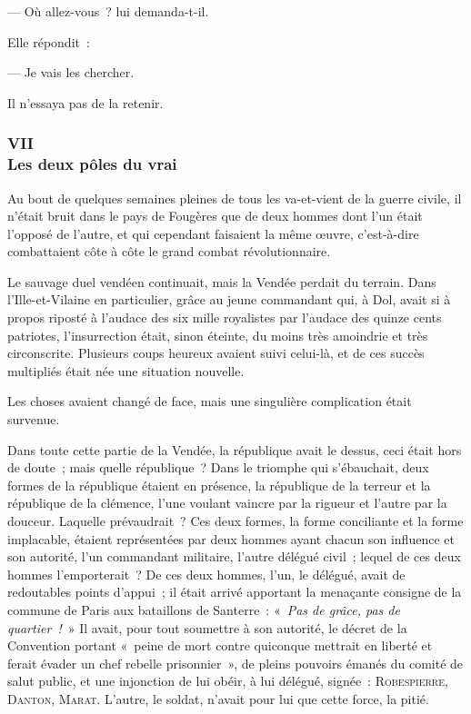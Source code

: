 \documentclass[french,twoside]{book} %
\begin{document}
— Où allez-vous ? lui demanda-t-il.\par
Elle répondit :\par
— Je vais les chercher.\par
Il n’essaya pas de la retenir.
 \subsubsection[{VII. Les deux pôles du vrai}]{VII \\
Les deux pôles du vrai}
\label{p3l2c7}
\noindent Au bout de quelques semaines pleines de tous les va-et-vient de la guerre civile, il n’était bruit dans le pays de Fougères que de deux hommes dont l’un était l’opposé de l’autre, et qui cependant faisaient la même œuvre, c’est-à-dire combattaient côte à côte le grand combat révolutionnaire.\par
Le sauvage duel vendéen continuait, mais la Vendée perdait du terrain. Dans l’Ille-et-Vilaine en particulier, grâce au jeune commandant qui, à Dol, avait si à propos riposté à l’audace des six mille royalistes par l’audace des quinze cents patriotes, l’insurrection était, sinon éteinte, du moins très amoindrie et très circonscrite. Plusieurs coups heureux avaient suivi celui-là, et de ces succès multipliés était née une situation nouvelle.\par
Les choses avaient changé de face, mais une singulière complication était survenue.\par
Dans toute cette partie de la Vendée, la république avait le dessus, ceci était hors de doute ; mais quelle république ? Dans le triomphe qui s’ébauchait, deux formes de la république étaient en présence, la république de la terreur et la république de la  clémence, l’une voulant vaincre par la rigueur et l’autre par la douceur. Laquelle prévaudrait ? Ces deux formes, la forme conciliante et la forme implacable, étaient représentées par deux hommes ayant chacun son influence et son autorité, l’un commandant militaire, l’autre délégué civil ; lequel de ces deux hommes l’emporterait ? De ces deux hommes, l’un, le délégué, avait de redoutables points d’appui ; il était arrivé apportant la menaçante consigne de la commune de Paris aux bataillons de Santerre : « \emph{Pas de grâce, pas de quartier !} » Il avait, pour tout soumettre à son autorité, le décret de la Convention portant « peine de mort contre quiconque mettrait en liberté et ferait évader un chef rebelle prisonnier », de pleins pouvoirs émanés du comité de salut public, et une injonction de lui obéir, à lui délégué, signée : R{\scshape obespierre}, D{\scshape anton}, M{\scshape arat}. L’autre, le soldat, n’avait pour lui que cette force, la pitié.\par
\end{document}
